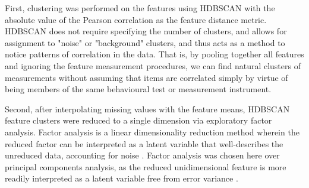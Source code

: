 \documentclass{article}
\begin{document}





First, clustering was performed on the features using HDBSCAN
\citep{campelloHierarchicalDensityEstimates2015,JMLR:v12:pedregosa11a} with
the absolute value of the Pearson correlation as the feature distance metric.
HDBSCAN does not require specifying the number of clusters, and allows for
assignment to "noise" or "background" clusters, and thus acts as a method to
notice patterns of correlation in the data. That is, by pooling together all
features and ignoring the feature measurement procedures, we can find natural
clusters of measurements without assuming that items are correlated simply by
virtue of being members of the same behavioural test or measurement
instrument.

Second, after interpolating missing values with the feature means, HDBSCAN
feature clusters were reduced to a single dimension via exploratory factor
analysis. Factor analysis is a linear dimensionality reduction method wherein
the reduced factor can be interpreted as a latent variable that
well-describes the unreduced data, accounting for noise
\citep{cattellScientificUseFactor1978,childEssentialsFactorAnalysis2006a}.
Factor analysis was chosen here over principal components analysis, as the
reduced unidimensional feature is more readily interpreted as a latent
variable free from error variance \cite{attiasIndependentFactorAnalysis1999}.
\end{document}
